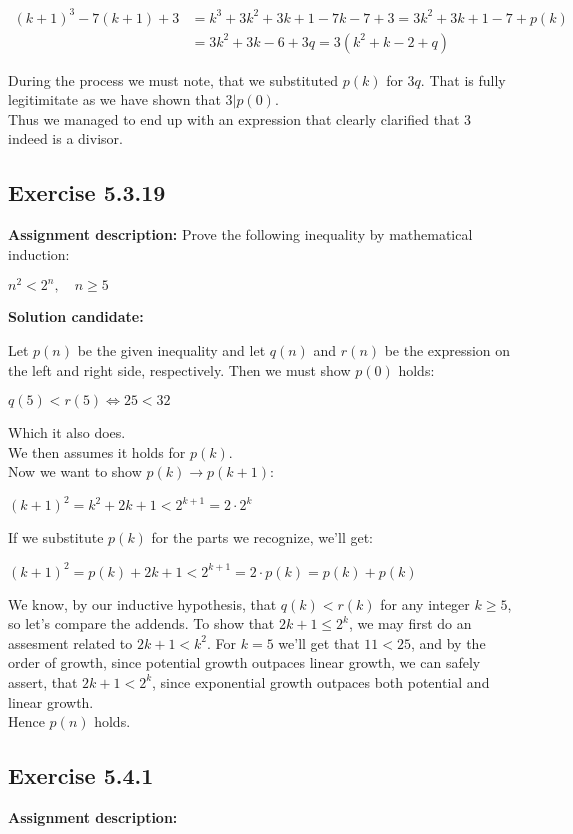 \documentclass{report}
\newcommand{\cent}[1]{\begin{center}#1\end{center}}
\newcommand{\mAlign}[1]{\begin{align*}#1\end{align*}}
\newcommand{\assignmentDescription}{\textbf{Assignment description: }}
\newcommand{\solution}{\textbf{Solution candidate: }}
\newcommand{\QED}{\boxed{}}
\newcommand{\Exercise}[1]{\subsection{Exercise #1}}
\newcommand{\parenthesis}[1]{\left( #1 \right)}
\begin{document}
 	\mAlign{
 		(k+1)^3-7(k+1) + 3 &= k^3+3k^2+3k+1 -7k-7 + 3 = 3k^2+3k+1-7 + p(k) \\ 
 		&= 3k^2+3k-6 + 3q = 3 \parenthesis{k^2+k-2+q}
 	}
 	
 	During the process we must note, that we substituted $p(k)$ for $3q$. That is fully legitimitate as we have shown that $3|p(0)$.\\
 	
 	Thus we managed to end up with an expression that clearly clarified that 3 indeed is a divisor.\\
 	\QED
 	
 	\Exercise{5.3.19}
 	
 	\assignmentDescription
 	Prove the following inequality by mathematical induction:
 	
 	\cent{$n^2 < 2^n, \quad n \geq 5$}
 	
 	\solution
 	
 	Let $p(n)$ be the given inequality and let $q(n)$ and $r(n)$ be the expression on the left and right side, respectively. Then we must show $p(0)$ holds:
 	
 	\cent{$ q(5) < r(5) \Leftrightarrow 25  < 32$}
 	
 	Which it also does.\\
 	
 	We then assumes it holds for $p(k)$.\\
 	
 	Now we want to show $p(k) \to p(k+1)$:
 	
 	\cent{$(k+1)^2 = k^2+2k+1 < 2^{k+1} = 2\cdot 2^k$}
 	
 	If we substitute $p(k)$ for the parts we recognize, we'll get:
 	
 	\cent{$(k+1)^2 = p(k) +2k+1 < 2^{k+1} = 2\cdot p(k) = p(k) + p(k)$}
 	
 	We know, by our inductive hypothesis, that $q(k) < r(k)$ for any integer $k \geq 5$, so let's compare the addends. To show that $ 2k+1 \leq 2^k  $, we may first do an assesment related to $2k + 1< k^2$. For $k=5$ we'll get that $11 < 25 $, and by the order of growth, since potential growth outpaces linear growth, we can safely assert, that $2k+1 < 2^k$, since exponential growth outpaces both potential and linear growth.\\ 
 	
 	Hence $p(n)$ holds.\\
 	\QED
 	
 	
 	\Exercise{5.4.1}
 	
 	\assignmentDescription
 	
\end{document}
